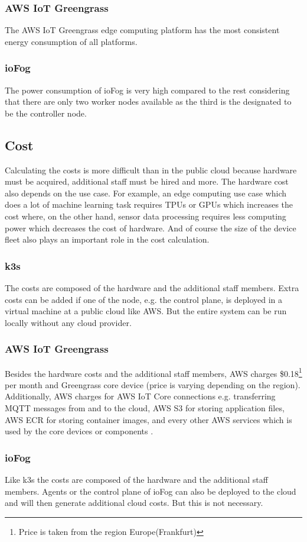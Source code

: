 \subsubsection*{AWS IoT Greengrass}
The AWS IoT Greengrass edge computing platform has the most consistent energy consumption of all platforms.

\subsubsection*{ioFog}
The power consumption of ioFog is very high compared to the rest considering that there are only two worker nodes available as the third is the designated to be the controller node.
\subsection*{Cost}
Calculating the costs is more difficult than in the public cloud because hardware must be acquired, additional staff must be hired and more. The hardware cost also depends on the use case. For example, an edge computing use case which does a lot of machine learning task requires TPUs or GPUs which increases the cost where, on the other hand, sensor data processing requires less computing power which decreases the cost of hardware. And of course the size of the device fleet also plays an important role in the cost calculation.

\subsubsection*{k3s}
The costs are composed of the hardware and the additional staff members. Extra costs can be added if one of the node, e.g. the control plane, is deployed in a virtual machine at a public cloud like \gls{AWS}. But the entire system can be run locally without any cloud provider.
    
\subsubsection*{AWS IoT Greengrass}
Besides the hardware costs and the additional staff members, \gls{AWS} charges \$0.18\footnote{Price is taken from the region Europe(Frankfurt)} per month and Greengrass core device (price is varying depending on the region). Additionally, \gls{AWS} charges for AWS IoT Core connections e.g. transferring MQTT messages from and to the cloud, AWS \gls{S3} for storing application files, AWS \gls{ECR} for storing container images, and every other AWS services which is used by the core devices or components \cite{AWSGGCPricing}.

\subsubsection*{ioFog}
Like k3s the costs are composed of the hardware and the additional staff members. Agents or the control plane of ioFog can also be deployed to the cloud and will then generate additional cloud costs. But this is not necessary.
